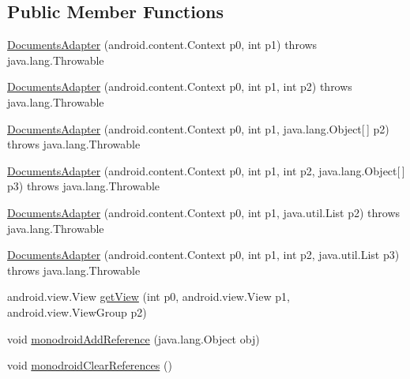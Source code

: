\subsection*{Public Member Functions}
\begin{DoxyCompactItemize}
\item 
\hyperlink{classfieldservice_1_1android_1_1adapters_1_1_documents_adapter_ae61ecbc18b7ad9bec9f24f14cd77f6a4}{Documents\+Adapter} (android.\+content.\+Context p0, int p1)  throws java.\+lang.\+Throwable 	
\item 
\hyperlink{classfieldservice_1_1android_1_1adapters_1_1_documents_adapter_a4e0264d3cd606f1f1ef228d4e0b19815}{Documents\+Adapter} (android.\+content.\+Context p0, int p1, int p2)  throws java.\+lang.\+Throwable 	
\item 
\hyperlink{classfieldservice_1_1android_1_1adapters_1_1_documents_adapter_a3d4edce2a6b3d7d90744bf2ae926dd40}{Documents\+Adapter} (android.\+content.\+Context p0, int p1, java.\+lang.\+Object\mbox{[}$\,$\mbox{]} p2)  throws java.\+lang.\+Throwable 	
\item 
\hyperlink{classfieldservice_1_1android_1_1adapters_1_1_documents_adapter_a3ba9240842b26ffbdd2ddd91daf9fbe3}{Documents\+Adapter} (android.\+content.\+Context p0, int p1, int p2, java.\+lang.\+Object\mbox{[}$\,$\mbox{]} p3)  throws java.\+lang.\+Throwable 	
\item 
\hyperlink{classfieldservice_1_1android_1_1adapters_1_1_documents_adapter_a7bff822b9e383ba3ac27d1b0294adf14}{Documents\+Adapter} (android.\+content.\+Context p0, int p1, java.\+util.\+List p2)  throws java.\+lang.\+Throwable 	
\item 
\hyperlink{classfieldservice_1_1android_1_1adapters_1_1_documents_adapter_a56ff69d9f573ac8ac51d55d764531cfb}{Documents\+Adapter} (android.\+content.\+Context p0, int p1, int p2, java.\+util.\+List p3)  throws java.\+lang.\+Throwable 	
\item 
android.\+view.\+View \hyperlink{classfieldservice_1_1android_1_1adapters_1_1_documents_adapter_af73b71f728b7aa957aad4e74f1a68004}{get\+View} (int p0, android.\+view.\+View p1, android.\+view.\+View\+Group p2)
\item 
void \hyperlink{classfieldservice_1_1android_1_1adapters_1_1_documents_adapter_adc6176241fc8434d91fbddc1735f0cc4}{monodroid\+Add\+Reference} (java.\+lang.\+Object obj)
\item 
void \hyperlink{classfieldservice_1_1android_1_1adapters_1_1_documents_adapter_a4f8a6931ee9a1e3a4c2147d132d4cff3}{monodroid\+Clear\+References} ()
\end{DoxyCompactItemize}


